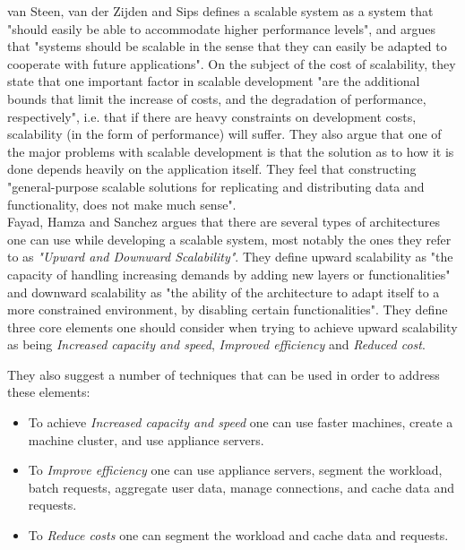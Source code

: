 \documentclass{article}
\begin{document}
{van Steen, van der Zijden and Sips\cite{van1998software} defines a scalable
system as a system that "should easily be able to accommodate higher
performance levels", and argues that "systems should be scalable in the sense
that they can easily be adapted to cooperate with future applications".  On the
subject of the cost of scalability, they state that one important factor in
scalable development "are the additional bounds that limit the increase of
costs, and the degradation of performance, respectively", i.e. that if there
are heavy constraints on development costs, scalability (in the form of
performance) will suffer.  They also argue that one of the major problems with
scalable development is that the solution as to how it is done depends heavily
on the application itself.  They feel that constructing "general-purpose
scalable solutions for replicating and distributing data and functionality,
does not make much sense".
\\

Fayad, Hamza and Sanchez \cite{fayad2005towards} argues that there are several
types of architectures one can use while developing a scalable system, most
notably the ones they refer to as \emph{"Upward and Downward Scalability"}.
They define upward scalability as "the capacity of handling increasing demands
by adding new layers or functionalities" and downward scalability as "the
ability of the architecture to adapt itself to a more constrained environment,
by disabling certain functionalities".
They define three core elements one should consider when trying to achieve
upward scalability as being \emph{Increased capacity and speed}, \emph{Improved
efficiency} and \emph{Reduced cost}. 

They also suggest a number of techniques that can be used in order to address
these elements: 
\begin{itemize}
\item{To achieve \emph{Increased capacity and speed} one can use faster
machines, create a machine cluster, and use appliance servers.} 
\item{To \emph{Improve efficiency} one can use appliance servers, segment the
workload, batch requests, aggregate user data, manage connections, and cache
data and requests.}  
\item{To \emph{Reduce costs} one can segment the workload and cache data and
requests.}
\end{itemize}

}
\end{document}
